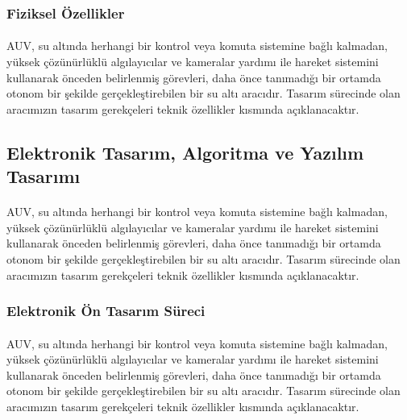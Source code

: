 \documentclass[12pt]{article}
\begin{document}
\subsubsection{Fiziksel Özellikler}

\begin{justify}
\paragraph{} AUV, su altında herhangi bir kontrol veya komuta sistemine bağlı kalmadan, yüksek çözünürlüklü algılayıcılar ve kameralar yardımı ile hareket sistemini kullanarak önceden belirlenmiş görevleri, daha önce tanımadığı bir ortamda otonom bir şekilde gerçekleştirebilen bir su altı aracıdır. Tasarım sürecinde olan aracımızın tasarım gerekçeleri teknik özellikler kısmında açıklanacaktır.
\end{justify}

\subsection{Elektronik Tasarım, Algoritma ve Yazılım Tasarımı}

\begin{justify}
\paragraph{} AUV, su altında herhangi bir kontrol veya komuta sistemine bağlı kalmadan, yüksek çözünürlüklü algılayıcılar ve kameralar yardımı ile hareket sistemini kullanarak önceden belirlenmiş görevleri, daha önce tanımadığı bir ortamda otonom bir şekilde gerçekleştirebilen bir su altı aracıdır. Tasarım sürecinde olan aracımızın tasarım gerekçeleri teknik özellikler kısmında açıklanacaktır.
\end{justify}

\subsubsection{Elektronik Ön Tasarım Süreci}

\begin{justify}
\paragraph{} AUV, su altında herhangi bir kontrol veya komuta sistemine bağlı kalmadan, yüksek çözünürlüklü algılayıcılar ve kameralar yardımı ile hareket sistemini kullanarak önceden belirlenmiş görevleri, daha önce tanımadığı bir ortamda otonom bir şekilde gerçekleştirebilen bir su altı aracıdır. Tasarım sürecinde olan aracımızın tasarım gerekçeleri teknik özellikler kısmında açıklanacaktır.
\end{justify}
\end{document}

